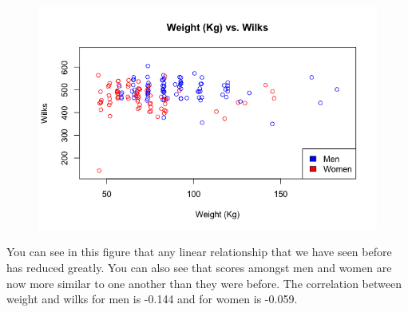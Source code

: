 \documentclass[10pt,letterpaper]{article}
\begin{document}
    \begin{figure}[H]
        \center
        \includegraphics[width=35em]{weightVSwilks.png}
        \label{wilks}
    \end{figure}

    You can see in this figure that any linear relationship that we have seen before has reduced greatly. You can also see that scores amongst men and women are now more similar to one another than they were before. The correlation between weight and wilks for men is -0.144 and for women is -0.059.
\end{document}

